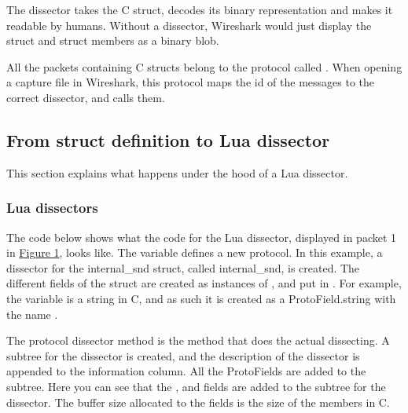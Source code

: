 \documentclass[A4paper,10pt,english]{sphinxmanual}
\begin{document}
The dissector takes the C struct, decodes its binary representation and makes it readable by humans. Without a dissector, Wireshark would just display the struct and struct members as a binary blob.

All the packets containing C structs belong to the protocol called . When opening a capture file in Wireshark, this protocol maps the id of the messages to the correct dissector, and calls them.


\subsection{From struct definition to Lua dissector}
\label{user/intro:from-struct-definition-to-lua-dissector}
This section explains what happens under the hood of a Lua dissector.


\subsubsection{Lua dissectors}
\label{user/intro:lua-dissectors}
The code below shows what the code for the Lua dissector, displayed in packet 1 in {\hyperref[user/intro:figure-1]{Figure 1}}, looks like. The  variable defines a new protocol. In this example, a dissector for the internal\_snd struct, called internal\_snd, is created. The different fields of the struct are created as instances of , and put in . For example, the  variable is a string in C, and as such it is created as a ProtoField.string with the name .

The protocol dissector method is the method that does the actual dissecting. A subtree for the dissector is created, and the description of the dissector is appended to the information column. All the ProtoFields are added to the subtree. Here you can see that the ,  and  fields are added to the subtree for the  dissector. The buffer size allocated to the fields is the size of the members in C.
\end{document}
